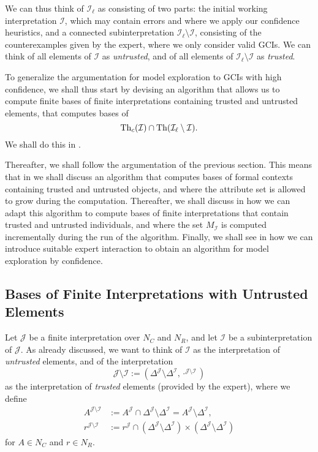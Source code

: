 We can thus think of $\mathcal{I}_{\ell}$ as consisting of two parts: the initial working
interpretation $\mathcal{I}$, which may contain errors and where we apply our confidence
heuristics, and a connected subinterpretation $\mathcal{I}_{\ell} \setminus \mathcal{I}$,
consisting of the counterexamples given by the expert, where we only consider valid GCIs.
We can think of all elements of $\mathcal{I}$ as \emph{untrusted}, and of all elements of
$\mathcal{I}_{\ell} \setminus \mathcal{I}$ as \emph{trusted}.

To generalize the argumentation for model exploration to GCIs with high confidence, we
shall thus start by devising an algorithm that allows us to compute finite bases of finite
interpretations containing trusted and untrusted elements, \ie that computes bases of
\begin{equation*}
  \operatorname{Th}_{c}(\mathcal{I}) \cap \operatorname{Th}(\mathcal{I}_{\ell} \setminus \mathcal{I}).
\end{equation*}
We shall do this in .

Thereafter, we shall follow the argumentation of the previous section.  This means that in
 we shall discuss an algorithm that computes bases of formal
contexts containing trusted and untrusted objects, and where the attribute set is allowed
to grow during the computation.  Thereafter, we shall discuss in
 how we can adapt this algorithm to compute bases of finite
interpretations that contain trusted and untrusted individuals, and where the set
$M_{\mathcal{I}}$ is computed incrementally during the run of the algorithm.  Finally, we
shall see in  how we can introduce suitable expert interaction to
obtain an algorithm for model exploration by confidence.

\subsection{Bases of Finite Interpretations with Untrusted Elements}
\label{sec:trust-untr-indiv}

Let $\mathcal{J}$ be a finite interpretation over $N_{C}$ and $N_{R}$, and let
$\mathcal{I}$ be a subinterpretation of $\mathcal{J}$.  As already discussed, we want to
think of $\mathcal{I}$ as the interpretation of \emph{untrusted} elements, and of the
interpretation
\begin{equation*}
  \mathcal{J} \setminus \mathcal{I} := (\Delta^{\mathcal{J}} \setminus
  \Delta^{\mathcal{I}}, \cdot^{\mathcal{J} \setminus \mathcal{I}})
\end{equation*}
as the interpretation of \emph{trusted} elements (provided by the expert), where we define
\begin{align*}
  A^{\mathcal{J} \setminus \mathcal{I}} &:= A^{\mathcal{J}} \cap \Delta^{\mathcal{J}}
  \setminus \Delta^{\mathcal{I}} = A^{\mathcal{J}} \setminus \Delta^{\mathcal{I}},\\
  r^{\mathcal{J} \setminus \mathcal{I}} &:= r^{\mathcal{J}} \cap (\Delta^{\mathcal{J}}
  \setminus \Delta^{\mathcal{I}}) \times (\Delta^{\mathcal{J}} \setminus \Delta^{\mathcal{I}})
\end{align*}
for $A \in N_{C}$ and $r \in N_{R}$.


